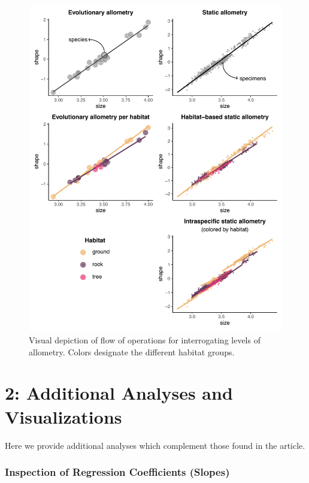 \documentclass[
  11pt,
]{article}
\begin{document}
\begin{figure}[H]

{\centering \includegraphics[width=0.9\linewidth]{Figs/figure_sup_allometries_ill} 

}

\caption{Visual depiction of flow of operations for interrogating levels of allometry. Colors designate the different habitat groups.}\label{fig:unnamed-chunk-2}
\end{figure}

\newpage

\hypertarget{additional-analyses-and-visualizations}{%
\section{2: Additional Analyses and
Visualizations}\label{additional-analyses-and-visualizations}}

Here we provide additional analyses which complement those found in the
article.

\hypertarget{inspection-of-regression-coefficients-slopes}{%
\subsubsection{Inspection of Regression Coefficients
(Slopes)}\label{inspection-of-regression-coefficients-slopes}}
\end{document}
